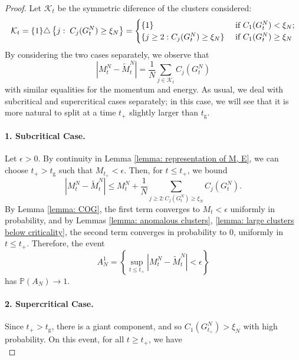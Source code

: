 \documentclass[11pt, notitlepage]{article}
\begin{document}
   \begin{proof} Let $\mathcal{K}_t$ be the symmetric diference of the clusters considered: \begin{equation}
      \mathcal{K}_t=\{1\}\triangle\left\{j: \hspace{0.1cm}C_j(G^N_t)\ge \xi_N \right\}=\begin{cases} \{1\} & \text{ if } C_1(G^N_t)< \xi_N; \\ \{j\ge 2: C_j(G^N_t) \ge \xi_N\} & \text{ if } C_1(G^N_t) \ge \xi_N \end{cases}  
  \end{equation} By considering the two cases separately, we observe that \begin{equation}
          \left|M^N_t-\widetilde{M}^N_t\right|=\frac{1}{N}\sum_{j\in\mathcal{K}_t} C_j(G^N_t) 
      \end{equation} with similar equalities for the momentum and energy. As usual, we deal with subcritical and supercritical cases separately; in this case, we will see that it is more natural to split at a time $t_+$ slightly larger than $t_\mathrm{g}.$\paragraph{1. Subcritical Case.} Let $\epsilon>0$. By continuity in Lemma \ref{lemma: representation of M, E}, we can choose $t_+>t_\mathrm{g}$ such that $M_{t_+}<\epsilon.$ Then, for $t\le t_+$, we bound \begin{equation}
          \left|M^N_t-\widetilde{M}^N_t\right| \le M^N_t +\frac{1}{N}\sum_{j\ge 2: C_j(G^N_t)\ge \xi_N} C_j(G^N_t).
      \end{equation} By Lemma \ref{lemma: COG}, the first term converges to $M_t <\epsilon$ uniformly in probability, and by Lemmas \ref{lemma: anomalous clusters}, \ref{lemma: large clusters below criticality}, the second term converges in probability to $0$, uniformly in $t\le t_+$. Therefore, the event \begin{equation}
          A^1_N=\left\{\sup_{t\le t_+} \left|M^N_t-\widetilde{M}^N_t\right|<\epsilon\right\}
      \end{equation} has $\mathbb{P}(A_N)\rightarrow 1.$ \paragraph{2. Supercritical Case.} Since $t_+>t_\mathrm{g}$, there is a giant component, and so $C_1(G^N_{t_+})>\xi_N$ with high probability. On this event, for all $t\ge t_+$, we have \begin{equation}

\end{equation}
\end{proof}
\end{document}
